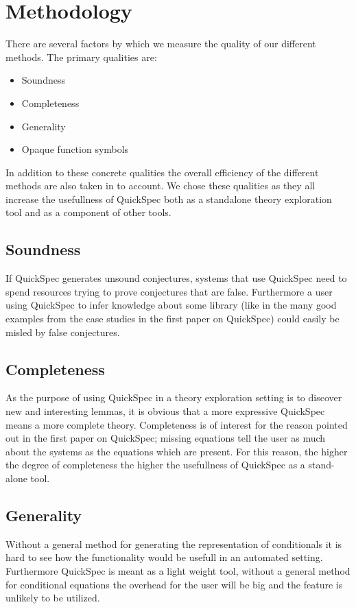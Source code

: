 \section{Methodology}
There are several factors by which we measure the quality of our different methods.
The primary qualities are:

\begin{itemize}

    \item Soundness
    \item Completeness
    \item Generality
    \item Opaque function symbols

\end{itemize}

In addition to these concrete qualities the overall efficiency of the different methods are also
taken in to account.
We chose these qualities as they all increase the usefullness
of QuickSpec both as a standalone theory exploration tool
and as a component of other tools.

    \subsection{Soundness}
    If QuickSpec generates unsound conjectures, systems that use QuickSpec
    need to spend resources trying to prove conjectures that are false. Furthermore
    a user using QuickSpec to infer knowledge about some library (like in the many
    good examples from the case studies in the first paper on QuickSpec) could easily
    be misled by false conjectures.

    \subsection{Completeness}
    As the purpose of using QuickSpec in a theory exploration setting is to discover
    new and interesting lemmas, it is obvious that a more expressive QuickSpec means a more
    complete theory. %
    Completeness is of interest for the reason pointed out in the first paper on QuickSpec\cite{Claessen2010};
    missing equations tell the user as much about the systems as the equations which are
    present. For this reason, the higher the degree of completeness the higher the usefullness
    of QuickSpec as a stand-alone tool. 

    \subsection{Generality}
    Without a general method for generating the representation of conditionals
    it is hard to see how the functionality would be usefull in an automated setting.
    Furthermore QuickSpec is meant as a light weight tool, without a general method
    for conditional equations the overhead for the user will be big and the feature
    is unlikely to be utilized.

